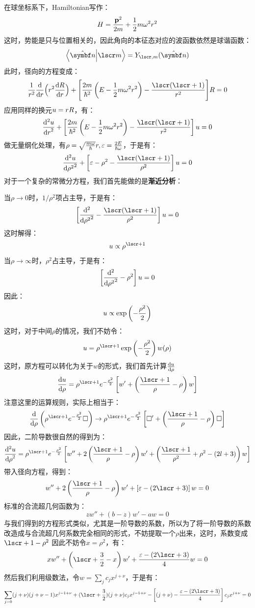 在球坐标系下，Hamiltonian写作：
\begin{align*}
H = \frac{\mathbf{p}^2}{2m} + \frac{1}{2}m\omega^2r^2
\end{align*}
这时，势能是只与位置相关的，因此角向的本征态对应的波函数依然是球谐函数：
\[
\bra{\uv{n}}\ket{\lscr m} = Y_{\lscr,m}(\uv{n})
\]
此时，径向的方程变成：
\begin{align*}
\frac{1}{r^2}\de{}{r}\Big(r^2\de{R}{r}\Big) + \Bigg[\frac{2m}{\hh^2}\br{E-\frac{1}{2}m\omega^2r^2} - \frac{\lscr(\lscr+1)}{r^2}\Bigg]R = 0 
\end{align*}
应用同样的换元\(u=rR\)，有：
\[
\dde{u}{r} + \mbr{\frac{2m}{\hh^2}\br{E-\frac{1}{2}m\omega^2r^2} - \frac{\lscr(\lscr+1)}{r^2}}u = 0
\]
做无量纲化处理，有\(\rho = \sqrt{\frac{m\omega}{\hbar}}r,\varepsilon = \frac{2E}{\hbar\omega}\)，于是有：
\[
\dde{u}{\rho^2} + \mbr{\varepsilon - \rho^2 - \frac{\lscr(\lscr+1)}{\rho^2}}u = 0
\]
对于一个复杂的常微分方程，我们首先能做的是\textbf{渐近分析}：\par\noindent
当\(\rho\to0\)时，\(1/\rho^2\)项占主导，于是有：
\[
\mbr{\dde{}{\rho^2} - \frac{\lscr(\lscr+1)}{\rho^2}}u = 0
\]
这时解得：
\[
u \propto \rho^{\lscr+1}
\]
当\(\rho\to\infty\)时，\(\rho^2\)占主导，于是有：
\[
\left[{\frac{\dd^2{}}{\dd{\rho^2}^2} - \rho^2}\right]u = 0
\]
因此：
\[
u\propto \exp\left({-\frac{\rho^2}{2}}\right)
\]
这时，对于中间\(\rho\)的情况，我们不妨令：
\[
u = \rho^{\lscr+1}\exp\br{-\frac{\rho^2}{2}}w(\rho)
\]
这时，原方程可以转化为关于\(w\)的形式，我们首先计算\(\frac{\dd{u}}{\dd{\rho}}\)
\[
\de{u}{\rho} = \rho^{\lscr+1}e^{-\frac{\rho^2}{2}}\mbr{w' + \br{\frac{\lscr+1}{\rho}-\rho}w}
\]
注意这里的运算规则，实际上相当于：
\[
\de{}{\rho}\br{\rho^{\lscr+1}e^{-\frac{\rho^2}{2}}\square} \to  \rho^{\lscr+1}e^{-\frac{\rho^2}{2}}\mbr{\square' + \br{\frac{\lscr+1}{\rho}-\rho}\square}
\]
因此，二阶导数很自然的得到为：
\[
\dde{u}{\rho} = \rho^{\lscr+1}e^{-\frac{\rho^2}{2}}\mbr{w'' + 2\br{\frac{\lscr+1}{\rho}-\rho} w' + \br{\frac{\lscr+1}{\rho^2}+\rho^{2}-(2l+3)}w}
\]
带入径向方程，得到：
\[
w'' + 2\br{\frac{\lscr+1}{\rho}-\rho} w' +\mbr{\varepsilon - (2\lscr+3)}w = 0
\]
标准的合流超几何函数为：
\[
zw'' + (b-z)w' - aw = 0
\]
与我们得到的方程形式类似，尤其是一阶导数的系数，所以为了将一阶导数的系数改造成与合流超几何系数完全相同的形式，不妨提取一个\(\rho\)出来，这时，系数变成\(\lscr+1-\rho^2\)
因此不妨令\(x=\rho^2\)，有：
\[
xw'' + \br{\lscr+\frac{3}{2}-x}w' + \frac{\varepsilon - \br{2\lscr+3}}{4}w = 0 
\]
然后我们利用级数法，令\(w = \sum_{j}c_{j}x^{j+\nu}\)，于是有：
\[
\sum_{j=0}(j+\nu)(j+\nu-1)x^{j-1+\nu} + (\lscr+\frac{3}{2})(j+\nu)c_{j}x^{j-1+\nu} - \mbr{(j+\nu)-\frac{\varepsilon - (2\lscr+3)}{4}}c_{j}x^{j+\nu} = 0
\]
